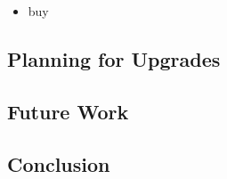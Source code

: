 \documentclass[a4paper,11pt]{article}
\begin{document}
\begin{itemize}
\item buy	
\end{itemize}







\subsection{Planning for Upgrades
	}
\subsection{Future Work
	}
\subsection{Conclusion
	}
		
	

	
	

	
	
	
	
\end{document}
